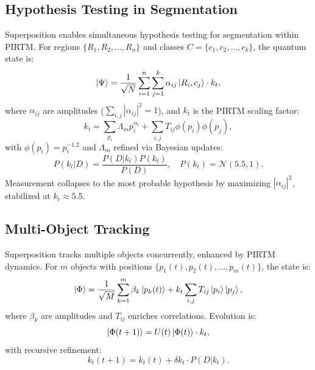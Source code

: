 \documentclass{article}
\theoremstyle{plain}
\begin{document}
\subsection{Hypothesis Testing in Segmentation}
Superposition enables simultaneous hypothesis testing for segmentation within PIRTM. For regions \( \{R_1, R_2, \dots, R_n\} \) and classes \( C = \{c_1, c_2, \dots, c_k\} \), the quantum state is:
\begin{equation}
\ket{\Psi} = \frac{1}{\sqrt{N}} \sum_{i=1}^{n} \sum_{j=1}^{k} \alpha_{ij} \ket{R_i, c_j} \cdot k_t,
\end{equation}
where \( \alpha_{ij} \) are amplitudes (\( \sum_{i,j} |\alpha_{ij}|^2 = 1 \)), and \( k_t \) is the PIRTM scaling factor:
\begin{equation}
k_t = \sum_{p_i} \Lambda_m p_i^{\alpha_t} + \sum_{i,j} T_{ij} \phi(p_i) \phi(p_j),
\end{equation}
with \( \phi(p_i) = p_i^{-1.2} \) and \( \Lambda_m \) refined via Bayesian updates:
\begin{equation}
P(k_t | D) = \frac{P(D | k_t) P(k_t)}{P(D)}, \quad P(k_t) = \mathcal{N}(5.5, 1).
\end{equation}
Measurement collapses to the most probable hypothesis by maximizing \( |\alpha_{ij}|^2 \), stabilized at \( k_t \approx 5.5 \).

\subsection{Multi-Object Tracking}
Superposition tracks multiple objects concurrently, enhanced by PIRTM dynamics. For \( m \) objects with positions \( \{p_1(t), p_2(t), \dots, p_m(t)\} \), the state is:
\begin{equation}
\ket{\Phi} = \frac{1}{\sqrt{M}} \sum_{k=1}^{m} \beta_k \ket{p_k(t)} + k_t \sum_{i,j} T_{ij} \ket{p_i} \ket{p_j},
\end{equation}
where \( \beta_k \) are amplitudes and \( T_{ij} \) enriches correlations. Evolution is:
\begin{equation}
\ket{\Phi(t+1)} = U(t) \ket{\Phi(t)} \cdot k_t,
\end{equation}
with recursive refinement:
\begin{equation}
k_t(t+1) = k_t(t) + \delta k_t \cdot P(D | k_t).
\end{equation}
\end{document}
